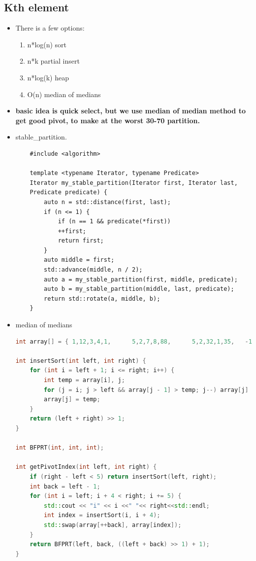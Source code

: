 \documentclass[a4paper,11pt,twoside]{book}
\begin{document}
\subsection{Kth element}
\begin{itemize}
	\item There is a few options:
	\begin{enumerate}
		\item n*log(n) sort
		\item n*k partial insert 
		\item n*log(k) heap 
		\item O(n) median of medians 
	\end{enumerate}

	\item \textbf{basic idea is quick select, but we use median of median method to get good pivot, to make at the worst 30-70 partition.}
	
	\item stable\_partition.
\begin{lstlisting}
	#include <algorithm>
	
	template <typename Iterator, typename Predicate>
	Iterator my_stable_partition(Iterator first, Iterator last,
	Predicate predicate) {
		auto n = std::distance(first, last);
		if (n <= 1) {
			if (n == 1 && predicate(*first))
			++first;
			return first;
		}
		auto middle = first;
		std::advance(middle, n / 2);
		auto a = my_stable_partition(first, middle, predicate);
		auto b = my_stable_partition(middle, last, predicate);
		return std::rotate(a, middle, b);
	}
\end{lstlisting}
	
	\item median of medians
\begin{lstlisting}[frame=single, language=c++, basicstyle=\scriptsize]
int array[] = { 1,12,3,4,1,      5,2,7,8,88,      5,2,32,1,35,   -1,7,5,38,-11 };

int insertSort(int left, int right) {
	for (int i = left + 1; i <= right; i++) {
		int temp = array[i], j;
		for (j = i; j > left && array[j - 1] > temp; j--) array[j] = array[j - 1];
		array[j] = temp;
	}
	return (left + right) >> 1;
}

int BFPRT(int, int, int);

int getPivotIndex(int left, int right) {
	if (right - left < 5) return insertSort(left, right);
	int back = left - 1;
	for (int i = left; i + 4 < right; i += 5) {
		std::cout << "i" << i <<" "<< right<<std::endl;
		int index = insertSort(i, i + 4);
		std::swap(array[++back], array[index]);
	}
	return BFPRT(left, back, ((left + back) >> 1) + 1);
}



\end{lstlisting}
\end{itemize}
\end{document}
